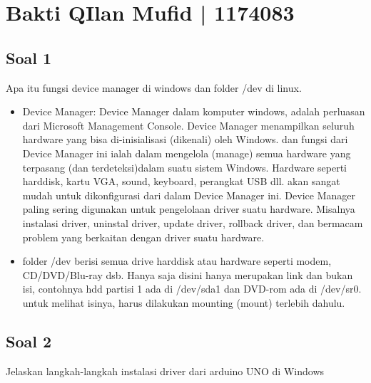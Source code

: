 ﻿\section{Bakti QIlan Mufid | 1174083}
\subsection{Soal 1}
Apa itu fungsi device manager di windows dan folder /dev di linux.
\begin{itemize}
	\item Device Manager: Device Manager dalam komputer windows, adalah perluasan dari Microsoft Management Console. Device Manager menampilkan seluruh hardware yang bisa di-inisialisasi (dikenali) oleh Windows. dan fungsi dari Device Manager ini ialah dalam mengelola (manage) semua hardware yang terpasang (dan terdeteksi)dalam suatu sistem Windows. Hardware seperti harddisk, kartu VGA, sound, keyboard, perangkat USB dll. akan sangat mudah untuk dikonfigurasi dari dalam Device Manager ini. Device Manager paling sering digunakan untuk pengelolaan driver suatu hardware. Misalnya instalasi driver, uninstal driver, update driver, rollback driver, dan bermacam problem yang berkaitan dengan driver suatu hardware.
	\item folder /dev berisi semua drive harddisk atau hardware seperti modem, CD/DVD/Blu-ray dsb. Hanya saja disini hanya merupakan link dan bukan isi, contohnya hdd partisi 1 ada di /dev/sda1 dan DVD-rom ada di /dev/sr0. untuk melihat isinya, harus dilakukan mounting (mount) terlebih dahulu.
\end{itemize}

\subsection{Soal 2}

Jelaskan langkah-langkah instalasi driver dari arduino UNO di Windows

